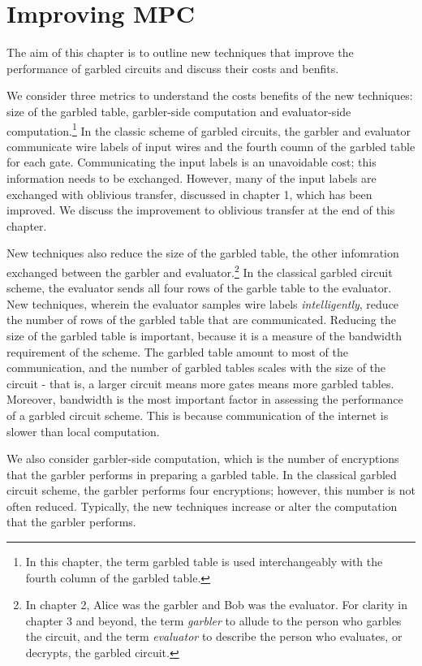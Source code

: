 \chapter{Improving MPC}

The aim of this chapter is to outline new techniques that improve the performance of garbled circuits and discuss their costs and benfits.

We consider three metrics to understand the costs benefits of the new techniques: size of the garbled table, garbler-side computation and evaluator-side computation.\footnote{In this chapter, the term garbled table is used interchangeably with the fourth column of the garbled table.}
In the classic scheme of garbled circuits, the garbler and evaluator communicate wire labels of input wires and the fourth coumn of the garbled table for each gate.
Communicating the input labels is an unavoidable cost; this information needs to be exchanged. 
However, many of the input labels are exchanged with oblivious transfer, discussed in chapter 1, which has been improved.
We discuss the improvement to oblivious transfer at the end of this chapter.

New techniques also reduce the size of the garbled table, the other infomration exchanged between the garbler and evaluator.\footnote{In chapter 2, Alice was the garbler and Bob was the evaluator. For clarity in chapter 3 and beyond, the term \textit{garbler} to allude to the person who garbles the circuit, and the term \textit{evaluator} to describe the person who evaluates, or decrypts, the garbled circuit.}
In the classical garbled circuit scheme, the evaluator sends all four rows of the garble table to the evaluator.
New techniques, wherein the evaluator samples wire labels \textit{intelligently}, reduce the number of rows of the garbled table that are communicated.
Reducing the size of the garbled table is important, because it is a measure of the bandwidth requirement of the scheme.
The garbled table amount to most of the communication, and the number of garbled tables scales with the size of the circuit - that is, a larger circuit means more gates means more garbled tables.
Moreover, bandwidth is the most important factor in assessing the performance of a garbled circuit scheme.
This is because communication of the internet is slower than local computation.

We also consider garbler-side computation, which is the number of encryptions that the garbler performs in preparing a garbled table.
In the classical garbled circuit scheme, the garbler performs four encryptions; however, this number is not often reduced.
Typically, the new techniques increase or alter the computation that the garbler performs.

